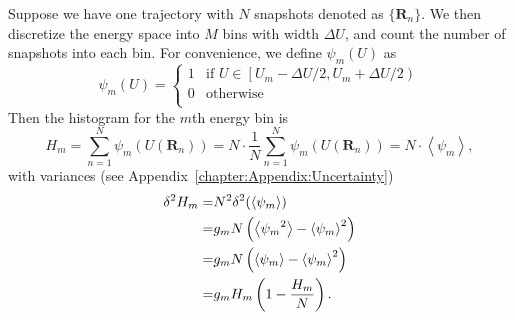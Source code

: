 Suppose we have one trajectory with $N$ snapshots denoted as $\{\mathbf{R}_n\}$. We then discretize the energy space into $M$ bins with width $\Delta U$, and count the number of snapshots into each bin. For convenience, we define $\psi_m(U)$ as
\begin{equation}
	\psi_m(U)= 
	\left\{ 
	\begin{array}{rl} 
	1 & \text{if }U\in \left[ U_m-\Delta U/2, U_m+\Delta U/2\right)\\ 
	0 & \text{otherwise}\\  
	\end{array} 
	\right. 
\end{equation}
Then the histogram for the $m$th energy bin is
\begin{equation}
	H_{m}=\sum\limits_{n=1}^{N}\psi_{m}(U(\mathbf{R}_n))=N\cdot \frac 1 N\sum\limits_{n=1}^{N}\psi_{m}(U(\mathbf{R}_n))=N\cdot\left<\psi_m\right>,
\end{equation}
with variances (see Appendix~\ref{chapter:Appendix:Uncertainty})
\begin{align}
	\delta^2 H_m=&N^2\delta^2(\left<\psi_m\right>)\notag\\
	            =&g_m N\left(\left<{\psi_m}^2\right>-\left<\psi_m\right>^2\right)\notag\\
	            =&g_m N\left(\left<\psi_m\right>-\left<\psi_m\right>^2\right)\notag\\
	            =&g_m H_m\left(1-\frac{H_m}{N}\right).
\end{align}

